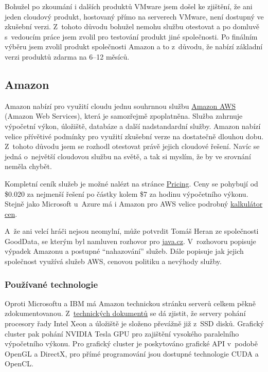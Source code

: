 Bohužel po zkoumání i dalších produktů VMware jsem došel ke zjištění, že ani jeden cloudový produkt, hostovaný přímo na serverech VMware, není dostupný ve zkušební verzi. Z~tohoto důvodu bohužel nemohu službu otestovat a po domluvě s~vedoucím práce jsem zvolil pro testování produkt jiné společnosti. Po finálním výběru jsem zvolil produkt společnosti Amazon a to z~důvodu, že nabízí základní verzi produktů zdarma na 6--12 měsíců.

\subsection{Amazon}
Amazon nabízí pro využití cloudu jednu souhrnnou službu \href{http://aws.amazon.com/}{Amazon AWS\cite{amazon:aws}} (Amazon Web Services), která je samozřejmě zpoplatněna. Služba zahrnuje výpočetní výkon, úložiště, databáze a další nadstandardní služby. Amazon nabízí velice přívětivé podmínky pro využití zkušební verze na dostatečně dlouhou dobu. Z~tohoto důvodu jsem se rozhodl otestovat právě jejich cloudové řešení. Navíc se jedná o~největší cloudovou službu na světě, a tak si myslím, že by ve srovnání neměla chybět.

Kompletní ceník služeb je možné nalézt na stránce \href{http://aws.amazon.com/ec2/pricing/}{Pricing\cite{amazon:ec2Pricing}}. Ceny se pohybují od \$0.020 za nejmenší řešení po částky kolem \$7 za hodinu výpočetního výkonu. Stejně jako Microsoft u~Azure má i Amazon pro AWS velice podrobný \href{http://calculator.s3.amazonaws.com/index.html}{kalkulátor cen\cite{amazon:calculator}}.

A~že ani velcí hráči nejsou neomylní, může potvrdit Tomáš Heran ze společnosti GoodData, se kterým byl namluven rozhovor pro \href{http://www.java.cz/article/czpodcast-56-cloud-aws}{java.cz\cite{java:aws}}. V~rozhovoru popisuje výpadek Amazonu a postupné "`nahazování"' služeb. Dále popisuje jak jejich společnost využívá služeb AWS, cenovou politiku a nevýhody služby.

\subsubsection{Používané technologie}
Oproti Microsoftu a IBM má Amazon technickou stránku serverů celkem pěkně zdokumentovanou. Z~\href{http://aws.amazon.com/ec2/instance-types/}{technických dokumentů\cite{amazon:ec2Instances}} se dá zjistit, že servery pohání procesory řady Intel Xeon a úložiště je složeno převážně již z~SSD disků. Grafický cluster pak pohání NVIDIA Tesla GPU pro zajištění vysokého paralelního výpočetního výkonu. Pro grafický cluster je poskytováno grafické API v~podobě OpenGL a DirectX, pro přímé programování jsou dostupné technologie CUDA a OpenCL.

